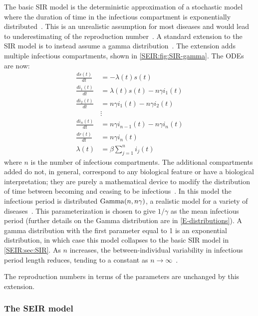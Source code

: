 \documentclass[thesis.tex]{subfiles}
\begin{document}
The basic SIR model is the deterministic approximation of a stochastic model where the duration of time in the infectious compartment is exponentially distributed~\autocite[96]{keelingModeling}.
This is an unrealistic assumption for most diseases and would lead to underestimating of the reproduction number~\autocite{lloydRealistic,wearingAppropriate}.
A standard extension to the SIR model is to instead assume a gamma distribution~\autocite[94]{keelingModeling,andersonSpread}.
The extension adds multiple infectious compartments, shown in \cref{SEIR:fig:SIR-gamma}.
The ODEs are now:
\begin{align}
\frac{ds(t)}{dt} &= -\lambda(t) s(t)\\
\frac{di_1(t)}{dt} &= \lambda(t) s(t) - n\gamma i_1(t) \\
\frac{di_2(t)}{dt} &= n\gamma i_1(t) - n \gamma i_2(t) \\
&\vdots \nonumber \\
\frac{di_n(t)}{dt} &= n\gamma i_{n-1}(t) - n \gamma i_n(t) \\
\frac{dr(t)}{dt} &= n\gamma i_n(t) \\
\lambda(t) &= \beta \sum_{j=1}^n i_j(t)
\end{align}
where $n$ is the number of infectious compartments.
The additional compartments added do not, in general, correspond to any biological feature or have a biological interpretation; they are purely a mathematical device to modify the distribution of time between becoming and ceasing to be infectious~\autocite{lloydRealistic}.
In this model the infectious period is distributed $\operatorname{Gamma}(n, n\gamma)$, a realistic model for a variety of diseases~\autocite{wearingAppropriate}.
This parameterization is chosen to give $1/\gamma$ as the mean infectious period (further details on the Gamma distribution are in \cref{E-distributions}).
A gamma distribution with the first parameter equal to 1 is an exponential distribution, in which case this model collapses to the basic SIR model in \cref{SEIR:sec:SIR}.
As $n$ increases, the between-individual variability in infectious period length reduces, tending to a constant as $n \to \infty$~\autocite{lloydRealistic}.

The reproduction numbers in terms of the parameters are unchanged by this extension.

\subsubsection{The SEIR model} \label{SEIR:sec:SEIR}
\end{document}
